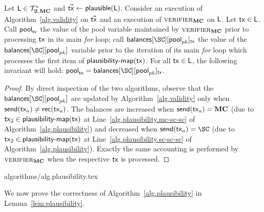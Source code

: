 \begin{lemma}\label{lem:plausible-balances}
  Let $\mathsf{L} \in \mathcal{T}_{\mathfrak{A},\mathbf{MC}}^*$ and $\vec{\mathsf{tx}} \gets \textsf{plausible}(\mathsf{L})$.
  Consider an execution of
  Algorithm~\ref{alg.validity} on $\vec{\mathsf{tx}}$ and an execution of
  $\textsc{verifier}_{\mathbf{MC}}$ on $\mathsf{L}$. Let $\mathsf{tx} \in \mathsf{L}$. Call
  $\textsf{pool}_{\mathsf{tx}}$ the value of the \textsf{pool} variable maintained by
  $\textsc{verifier}_{\mathbf{MC}}$ prior to processing $\mathsf{tx}$ in its
  main \emph{for} loop; call
  $\textsf{balances}[\SC][\textsf{pool}_{pk}]_{\tx}$ the value of the
  $\textsf{balances}[\SC][\textsf{pool}_{pk}]$ variable prior to the iteration
  of its main \emph{for} loop which processes the first item of
  $\textsf{plausibility-map}(\mathsf{tx})$. For all $\mathsf{tx} \in \mathsf{L}$, the following
  invariant will hold: $\textsf{pool}_{\tx} =
  \textsf{balances}[\SC][\textsf{pool}_{pk}]_{\tx}$.
\end{lemma}

\begin{proof}
  By direct inspection of the two algorithms, observe that the
  $\textsf{balances}[\SC][\textsf{pool}_{pk}]$ are updated by
  Algorithm~\ref{alg.validity} only when $\mathsf{send}(\mathsf{tx}_a) \neq \mathsf{rec}(\mathsf{tx}_a)$. The
  balances are increased when $\mathsf{send}(\mathsf{tx}_a) = \mathbf{MC}$ (due to $\mathsf{tx}_2 \in
  \textsf{plausibility-map}(\mathsf{tx})$ at Line~\ref{alg.plausibility.mc-sc-sc} of
  Algorithm~\ref{alg.plausibility}) and decreased when $\send(\tx_a) = \SC$ (due
  to $\mathsf{tx}_2 \in \textsf{plausibility-map}(\mathsf{tx})$ at
  Line~\ref{alg.plausibility.sc-sc-sc} of Algorithm~\ref{alg.plausibility}).
  Exactly the same accounting is performed by $\textsc{verifier}_{\mathbf{MC}}$ when the
  respective $\mathsf{tx}$ is processed.
\end{proof}

{algorithms/alg.plausibility.tex}

We now prove the correctness of Algorithm~\ref{alg.plausibility} in
Lemma~\ref{lem:plausibility}.

